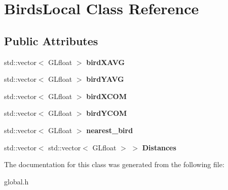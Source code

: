 \hypertarget{class_birds_local}{}\section{Birds\+Local Class Reference}
\label{class_birds_local}
\subsection*{Public Attributes}
\begin{DoxyCompactItemize}
\item 
\mbox{\label{class_birds_local_a83b707f24af7b351072dfcf4f5d60573}} 
std\+::vector$<$ G\+Lfloat $>$ {\bfseries bird\+X\+A\+VG}
\item 
\mbox{\label{class_birds_local_ad486bc92d95fd45c1df5f5563bf427fe}} 
std\+::vector$<$ G\+Lfloat $>$ {\bfseries bird\+Y\+A\+VG}
\item 
\mbox{\label{class_birds_local_af7d8545cc64e29d1778066f0a829f899}} 
std\+::vector$<$ G\+Lfloat $>$ {\bfseries bird\+X\+C\+OM}
\item 
\mbox{\label{class_birds_local_a5530ddba22687e29fed4bc348e7ad29b}} 
std\+::vector$<$ G\+Lfloat $>$ {\bfseries bird\+Y\+C\+OM}
\item 
\mbox{\label{class_birds_local_a2f24b0304be5870b2a853e20a7d1f081}} 
std\+::vector$<$ G\+Lfloat $>$ {\bfseries nearest\+\_\+bird}
\item 
\mbox{\label{class_birds_local_aac72068ce60c562aa0e1b264bfdeb25c}} 
std\+::vector$<$ std\+::vector$<$ G\+Lfloat $>$ $>$ {\bfseries Distances}
\end{DoxyCompactItemize}


The documentation for this class was generated from the following file\+:\begin{DoxyCompactItemize}
\item 
global.\+h\end{DoxyCompactItemize}

